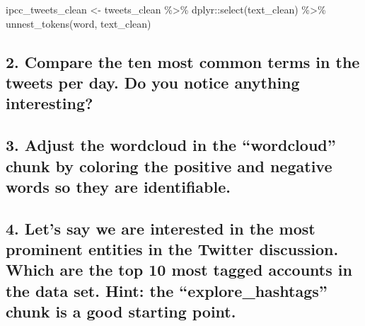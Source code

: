 \documentclass[
]{article}
\newenvironment{Shaded}{\begin{snugshade}}{\end{snugshade}}
\newcommand{\FunctionTok}[1]{\textcolor[rgb]{0.00,0.00,0.00}{#1}}
\newcommand{\NormalTok}[1]{#1}
\newcommand{\OtherTok}[1]{\textcolor[rgb]{0.56,0.35,0.01}{#1}}
\newcommand{\SpecialCharTok}[1]{\textcolor[rgb]{0.00,0.00,0.00}{#1}}
\begin{document}
\begin{Shaded}
\begin{Highlighting}[]
\NormalTok{ipcc\_tweets\_clean }\OtherTok{\textless{}{-}}\NormalTok{ tweets\_clean }\SpecialCharTok{\%\textgreater{}\%}
\NormalTok{  dplyr}\SpecialCharTok{::}\FunctionTok{select}\NormalTok{(text\_clean) }\SpecialCharTok{\%\textgreater{}\%}
  \FunctionTok{unnest\_tokens}\NormalTok{(word, text\_clean)}
\end{Highlighting}
\end{Shaded}

\hypertarget{compare-the-ten-most-common-terms-in-the-tweets-per-day.-do-you-notice-anything-interesting}{%
\subsection{2. Compare the ten most common terms in the tweets per day.
Do you notice anything
interesting?}\label{compare-the-ten-most-common-terms-in-the-tweets-per-day.-do-you-notice-anything-interesting}}

\hypertarget{adjust-the-wordcloud-in-the-wordcloud-chunk-by-coloring-the-positive-and-negative-words-so-they-are-identifiable.}{%
\subsection{3. Adjust the wordcloud in the ``wordcloud'' chunk by
coloring the positive and negative words so they are
identifiable.}\label{adjust-the-wordcloud-in-the-wordcloud-chunk-by-coloring-the-positive-and-negative-words-so-they-are-identifiable.}}

\hypertarget{lets-say-we-are-interested-in-the-most-prominent-entities-in-the-twitter-discussion.-which-are-the-top-10-most-tagged-accounts-in-the-data-set.-hint-the-explore_hashtags-chunk-is-a-good-starting-point.}{%
\subsection{4. Let's say we are interested in the most prominent
entities in the Twitter discussion. Which are the top 10 most tagged
accounts in the data set. Hint: the ``explore\_hashtags'' chunk is a
good starting
point.}\label{lets-say-we-are-interested-in-the-most-prominent-entities-in-the-twitter-discussion.-which-are-the-top-10-most-tagged-accounts-in-the-data-set.-hint-the-explore_hashtags-chunk-is-a-good-starting-point.}}
\end{document}
